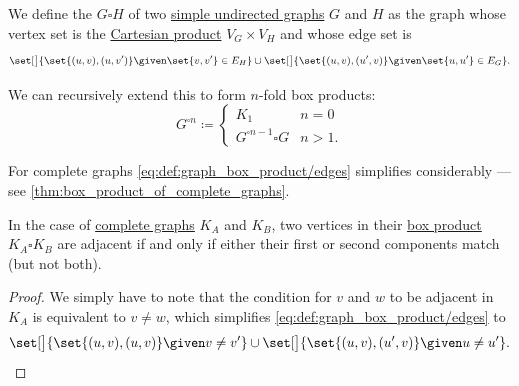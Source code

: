 \begin{definition}\label{def:graph_box_product}
  We define the  \( G \square H \) of two \hyperref[def:undirected_graph]{simple undirected graphs} \( G \) and \( H \) as the graph whose vertex set is the \hyperref[def:cartesian_product]{Cartesian product} \( V_G \times V_H \) and whose edge set is
  \begin{equation}\label{eq:def:graph_box_product/edges}
    \set[\big]{ \set{ (u, v), (u, v') } \given \set{ v, v' } \in E_H } \cup \set[\big]{ \set{ (u, v), (u', v) } \given \set{ u, u' } \in E_G }.
  \end{equation}

  We can recursively extend this to form \( n \)-fold box products:
  \begin{equation}\label{eq:def:graph_box_product/recursive}
    G^{\square n} \coloneqq \begin{cases}
      K_1                           &n = 0 \\
      G^{\square n - 1} \square G &n > 1.
    \end{cases}
  \end{equation}
\end{definition}
\begin{comments}
  \item For complete graphs \eqref{eq:def:graph_box_product/edges} simplifies considerably --- see \cref{thm:box_product_of_complete_graphs}.
\end{comments}

\begin{proposition}\label{thm:box_product_of_complete_graphs}
  In the case of \hyperref[def:complete_graph]{complete graphs} \( K_A \) and \( K_B \), two vertices in their \hyperref[def:graph_box_product]{box product} \( K_A \square K_B \) are adjacent if and only if either their first or second components match (but not both).
\end{proposition}
\begin{proof}
  We simply have to note that the condition for \( v \) and \( w \) to be adjacent in \( K_A \) is equivalent to \( v \neq w \), which simplifies \eqref{eq:def:graph_box_product/edges} to
  \begin{equation*}
    \set[\big]{ \set{ (u, v), (u, v) } \given v \neq v' } \cup \set[\big]{ \set{ (u, v), (u', v) } \given u \neq u' }.
  \end{equation*}
\end{proof}

